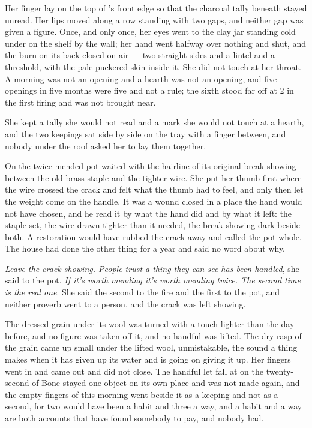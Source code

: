 Her finger lay on the top of 's front edge so that the charcoal tally beneath stayed unread. Her lips moved along a row standing with two gaps, and neither gap was given a figure. Once, and only once, her eyes went to the clay jar standing cold under  on the shelf by the wall; her hand went halfway over nothing and shut, and the burn on its back closed on air --- two straight sides and a lintel and a threshold, with the pale puckered skin inside it. She did not touch  at her throat. A morning was not an opening and a hearth was not an opening, and five openings in five months were five and not a rule; the sixth stood far off at  2 in the first firing and was not brought near.

She kept a tally she would not read and a mark she would not touch at a hearth, and the two keepings sat side by side on the tray with a finger between, and nobody under the roof asked her to lay them together.

On  the twice-mended pot waited with the hairline of its original break showing between the old-brass staple and the tighter wire. She put her thumb first where the wire crossed the crack and felt what the thumb had to feel, and only then let the weight come on the handle. It was a wound closed in a place the hand would not have chosen, and he read it by what the hand did and by what it left: the staple set, the wire drawn tighter than it needed, the break showing dark beside both. A restoration would have rubbed the crack away and called the pot whole. The house had done the other thing for a year and said no word about why.

\emph{Leave the crack showing. People trust a thing they can see has been handled}, she said to the pot. \emph{If it's worth mending it's worth mending twice. The second time is the real one}. She said the second to the fire and the first to the pot, and neither proverb went to a person, and the crack was left showing.

The dressed grain under its wool was turned with a touch lighter than the day before, and no figure was taken off it, and no handful was lifted. The dry rasp of the grain came up small under the lifted wool, unmistakable, the sound a thing makes when it has given up its water and is going on giving it up. Her fingers went in and came out and did not close. The handful let fall at  on the twenty-second of Bone stayed one object on its own place and was not made again, and the empty fingers of this morning went beside it as a keeping and not as a second, for two would have been a habit and three a way, and a habit and a way are both accounts that have found somebody to pay, and nobody had.


